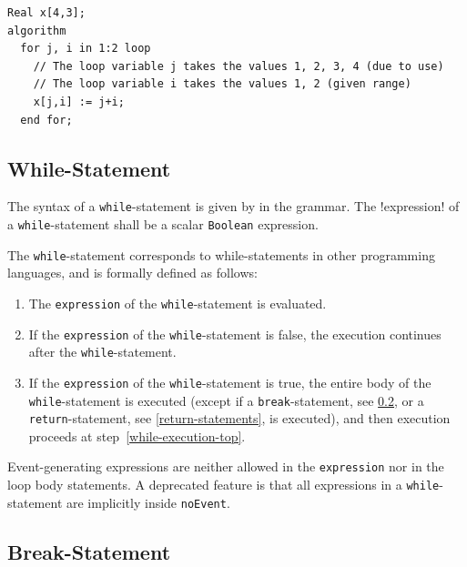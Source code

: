 \begin{example}
\begin{lstlisting}[language=modelica]
  Real x[4,3];
algorithm
  for j, i in 1:2 loop
    // The loop variable j takes the values 1, 2, 3, 4 (due to use)
    // The loop variable i takes the values 1, 2 (given range)
    x[j,i] := j+i;
  end for;
\end{lstlisting}
\end{example}


\subsection{While-Statement}\label{while-statement}

The syntax of a \lstinline!while!-statement is given by  in the grammar.
The \productionref!expression! of a \lstinline!while!-statement shall be a scalar \lstinline!Boolean! expression.

The \lstinline!while!-statement corresponds to while-statements in other programming languages, and is formally defined as follows:
\begin{enumerate}
\item
  \label{while-execution-top}
  The \lstinline!expression! of the \lstinline!while!-statement is evaluated.
\item
  If the \lstinline!expression! of the \lstinline!while!-statement is false, the execution continues after the \lstinline!while!-statement.
\item
  If the \lstinline!expression! of the \lstinline!while!-statement is true, the entire body of the \lstinline!while!-statement is executed (except if a \lstinline!break!-statement, see \cref{break-statement}, or a \lstinline!return!-statement, see \cref{return-statements}, is executed), and then execution proceeds at step~\ref{while-execution-top}.
\end{enumerate}

Event-generating expressions are neither allowed in the \lstinline!expression! nor in the loop body statements.
A deprecated feature is that all expressions in a \lstinline!while!-statement are implicitly inside \lstinline!noEvent!.


\subsection{Break-Statement}\label{break-statement}

